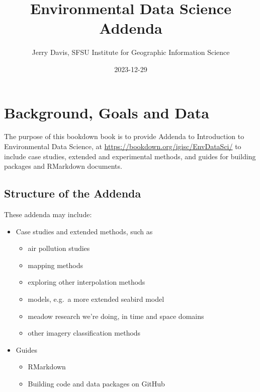 \documentclass[
]{book}
\title{Environmental Data Science Addenda}
\author{Jerry Davis, SFSU Institute for Geographic Information Science}
\date{2023-12-29}
\providecommand{\tightlist}{%
  \setlength{\itemsep}{0pt}\setlength{\parskip}{0pt}}
\begin{document}
\maketitle

{
\hypersetup{linkcolor=}
\setcounter{tocdepth}{2}
\tableofcontents
}
\listoffigures
\mainmatter

\hypertarget{background-goals-and-data}{%
\chapter{Background, Goals and Data}\label{background-goals-and-data}}

The purpose of this bookdown book is to provide Addenda to Introduction to Environmental Data Science, at \url{https://bookdown.org/igisc/EnvDataSci/} to include case studies, extended and experimental methods, and guides for building
packages and RMarkdown documents.

\hypertarget{structure-of-the-addenda}{%
\section{Structure of the Addenda}\label{structure-of-the-addenda}}

These addenda may include:

\begin{itemize}
\tightlist
\item
  Case studies and extended methods, such as

  \begin{itemize}
  \tightlist
  \item
    air pollution studies
  \item
    mapping methods
  \item
    exploring other interpolation methods
  \item
    models, e.g.~a more extended seabird model
  \item
    meadow research we're doing, in time and space domains
  \item
    other imagery classification methods
  \end{itemize}
\item
  Guides

  \begin{itemize}
  \tightlist
  \item
    RMarkdown
  \item
    Building code and data packages on GitHub
  \end{itemize}
\end{itemize}
\end{document}
